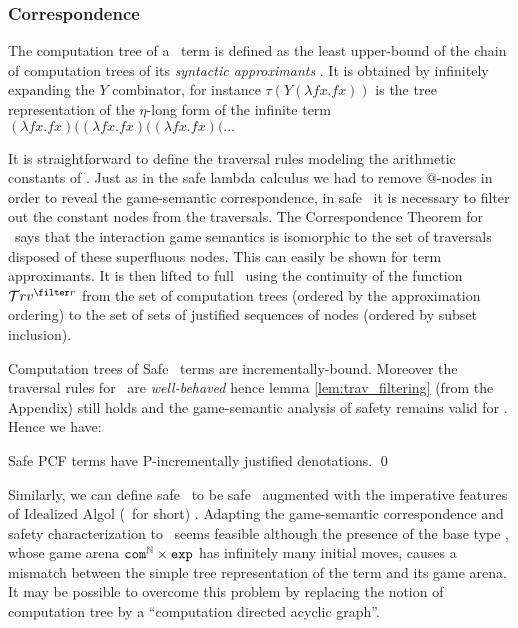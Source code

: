 \subsubsection{Correspondence}

The computation tree of a \pcf\ term is defined as the least
upper-bound of the chain of computation trees of its \emph{syntactic approximants} \cite{abramsky:game-semantics-tutorial}.  It is
obtained by infinitely expanding the $Y$ combinator,
for instance $\tau(Y (\lambda f x. f x))$ is the tree representation
of the $\eta$-long form of the infinite term $(\lambda f x. f x)
 ((\lambda f x. f x) ((\lambda f x. f x) ( \ldots$

It is straightforward to define the traversal rules modeling the
arithmetic constants of \pcf. Just as in the safe lambda calculus
we had to remove @-nodes in order to reveal the game-semantic
correspondence, in safe \pcf\ it is necessary to filter out the
constant nodes from the traversals. The Correspondence Theorem for
\pcf\ says that the interaction game semantics is isomorphic to the
set of traversals disposed of these superfluous nodes. This can easily be shown
for term approximants. It is then lifted to full \pcf\ using the continuity of the function
$\travset^{\filter r}$ from the set of computation trees (ordered by the approximation ordering) to the set of sets of justified sequences of nodes (ordered by subset inclusion).


Computation trees of Safe \pcf\ terms are incrementally-bound.
Moreover the traversal rules for \pcf\ are \emph{well-behaved} hence
lemma \ref{lem:trav_filtering} (from the Appendix) still holds and
the game-semantic analysis of safety remains valid for \pcf. Hence
we have:
\begin{theorem}
\label{thm:safepcfpincr}
Safe PCF terms have P-incrementally justified denotations. \qed
\end{theorem}

Similarly, we can define safe \ialgol\ to be safe \pcf\ augmented with
the imperative features of Idealized Algol (\ialgol\ for short)
\cite{Reynolds81}.  Adapting the game-semantic correspondence and
safety characterization to \ialgol\ seems feasible although the
presence of the base type \iavar, whose game arena $\texttt{com}^{\mathbb{N}}
\times \texttt{exp}$ has infinitely many initial moves, causes a mismatch
between the simple tree representation of the term and its game
arena. It may be possible to overcome this problem by replacing the
notion of computation tree by a ``computation directed acyclic
graph''.

